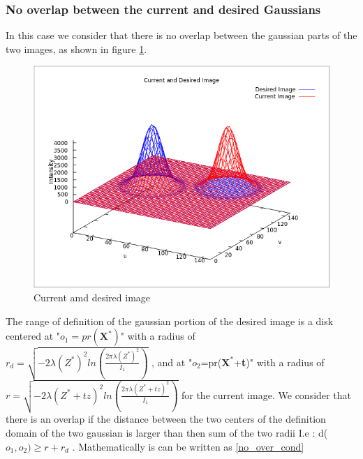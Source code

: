 \subsubsection{No overlap between the current and desired Gaussians}\label{no_overlap_section}
In this case we consider that there is no overlap between the gaussian parts of the two images, as shown in figure \ref{no_overlap}. \\
\begin{figure}[h!]
        \centering
        \includegraphics[scale = 0.5]{figures/no_overlap.png}
        \caption{Current amd desired image }
        \label{no_overlap}
\end{figure}
The range of definition of the gaussian portion of the desired image is a disk centered at "$o_{1} = pr(\textbf{X}^{*})$" with a radius of \\ $r_{d}=\sqrt{-2\lambda(Z^{*})^{2} ln\left( \frac{2\pi\lambda(Z^{*})^{2}}{I_{1}}\right)} $
, and at "$o_{2}$=pr($\textbf{X}^{*}$+\textbf{t})" with a radius of $r = \sqrt{-2\lambda(Z^{*}+tz)^{2} ln\left( \frac{2\pi\lambda(Z^{*}+tz)^{2}}{I_{1}}\right)}$ for the current image. We consider that there is 
an overlap if the distance between the two centers of the definition domain of the two gaussian is larger than then sum of the two radii I.e : d($o_{1},o_{2}) \geq r +r_{d}$ . Mathematically is can be written as \eqref{no_over_cond}
